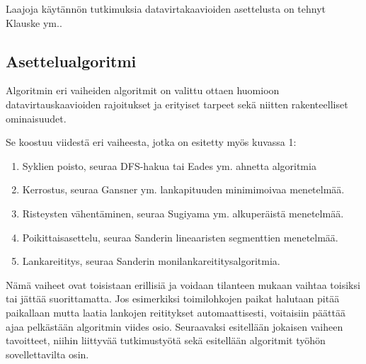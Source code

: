 \documentclass[finnish,12pt]{article}
\begin{document}
Laajoja käytännön tutkimuksia datavirtakaavioiden asettelusta on tehnyt Klauske ym.\cite{RefWorks:50}.

		\subsection{Asettelualgoritmi}

Algoritmin eri vaiheiden algoritmit on valittu ottaen huomioon datavirtauskaavioiden rajoitukset ja erityiset tarpeet sekä niitten rakenteelliset ominaisuudet.

Se koostuu viidestä eri vaiheesta, jotka on esitetty myös kuvassa 1:
\begin{enumerate}
  \item Syklien poisto, seuraa DFS-hakua \cite{RefWorks:69} tai Eades ym. ahnetta algoritmia \cite{RefWorks:48}
  \item Kerrostus, seuraa Gansner ym. lankapituuden minimimoivaa menetelmää. \cite{RefWorks:28}
  \item Risteysten vähentäminen, seuraa Sugiyama ym. alkuperäistä menetelmää. \cite{RefWorks:9}
  \item Poikittaisasettelu, seuraa Sanderin lineaaristen segmenttien menetelmää. \cite{RefWorks:49}
  \item Lankareititys, seuraa Sanderin monilankareititysalgoritmia. \cite{RefWorks:17}
\end{enumerate}

Nämä vaiheet ovat toisistaan erillisiä ja voidaan tilanteen mukaan vaihtaa toisiksi tai jättää suorittamatta.
Jos esimerkiksi toimilohkojen paikat halutaan pitää paikallaan mutta laatia lankojen reititykset automaattisesti, voitaisiin päättää ajaa pelkästään algoritmin viides osio.
Seuraavaksi esitellään jokaisen vaiheen tavoitteet, niihin liittyvää tutkimustyötä sekä esitellään algoritmit työhön sovellettavilta osin.
\end{document}
